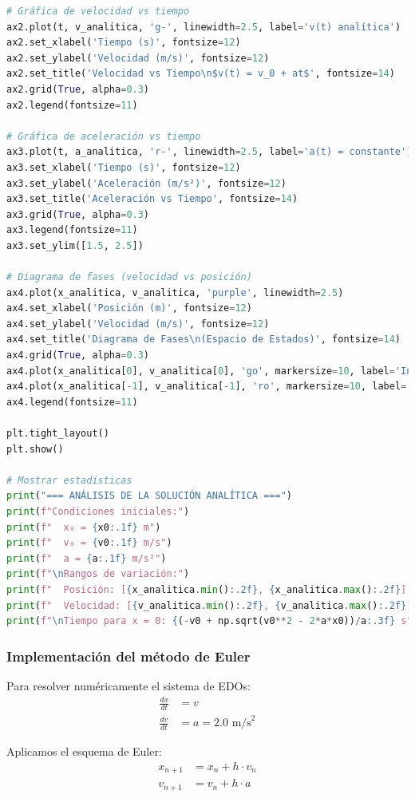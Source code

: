 \documentclass{article}
\begin{document}
\begin{lstlisting}[language=Python, caption={Implementación de la solución analítica}]
# Gráfica de velocidad vs tiempo
ax2.plot(t, v_analitica, 'g-', linewidth=2.5, label='v(t) analítica')
ax2.set_xlabel('Tiempo (s)', fontsize=12)
ax2.set_ylabel('Velocidad (m/s)', fontsize=12)
ax2.set_title('Velocidad vs Tiempo\n$v(t) = v_0 + at$', fontsize=14)
ax2.grid(True, alpha=0.3)
ax2.legend(fontsize=11)

# Gráfica de aceleración vs tiempo
ax3.plot(t, a_analitica, 'r-', linewidth=2.5, label='a(t) = constante')
ax3.set_xlabel('Tiempo (s)', fontsize=12)
ax3.set_ylabel('Aceleración (m/s²)', fontsize=12)
ax3.set_title('Aceleración vs Tiempo', fontsize=14)
ax3.grid(True, alpha=0.3)
ax3.legend(fontsize=11)
ax3.set_ylim([1.5, 2.5])

# Diagrama de fases (velocidad vs posición)
ax4.plot(x_analitica, v_analitica, 'purple', linewidth=2.5)
ax4.set_xlabel('Posición (m)', fontsize=12)
ax4.set_ylabel('Velocidad (m/s)', fontsize=12)
ax4.set_title('Diagrama de Fases\n(Espacio de Estados)', fontsize=14)
ax4.grid(True, alpha=0.3)
ax4.plot(x_analitica[0], v_analitica[0], 'go', markersize=10, label='Inicio')
ax4.plot(x_analitica[-1], v_analitica[-1], 'ro', markersize=10, label='Final')
ax4.legend(fontsize=11)

plt.tight_layout()
plt.show()

# Mostrar estadísticas
print("=== ANÁLISIS DE LA SOLUCIÓN ANALÍTICA ===")
print(f"Condiciones iniciales:")
print(f"  x₀ = {x0:.1f} m")
print(f"  v₀ = {v0:.1f} m/s") 
print(f"  a = {a:.1f} m/s²")
print(f"\nRangos de variación:")
print(f"  Posición: [{x_analitica.min():.2f}, {x_analitica.max():.2f}] m")
print(f"  Velocidad: [{v_analitica.min():.2f}, {v_analitica.max():.2f}] m/s")
print(f"\nTiempo para x = 0: {(-v0 + np.sqrt(v0**2 - 2*a*x0))/a:.3f} s")
	\end{lstlisting}

	\subsubsection{Implementación del método de Euler}
	
	Para resolver numéricamente el sistema de EDOs:
	\begin{align}
		\frac{dx}{dt} &= v \\
		\frac{dv}{dt} &= a = 2.0 \text{ m/s}^2
	\end{align}
	
	Aplicamos el esquema de Euler:
	\begin{align}
		x_{n+1} &= x_n + h \cdot v_n \\
		v_{n+1} &= v_n + h \cdot a
	\end{align}
	
\end{document}
